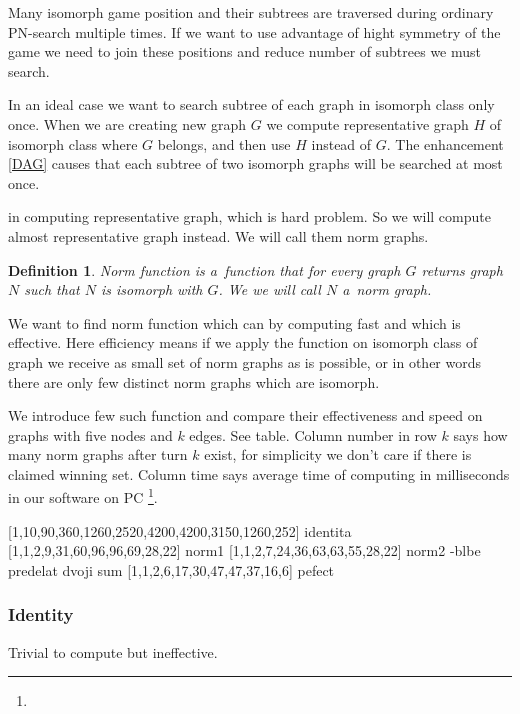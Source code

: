Many isomorph game position and their subtrees are traversed during ordinary
PN-search multiple times. If we want to use advantage of hight symmetry of the
game we need to join these positions and reduce number of subtrees we must
search.

In an ideal case we want to search subtree of each graph in isomorph class only
once. When we are creating new graph $G$ we compute 
representative graph $H$ of isomorph class where $G$ belongs, and then use $H$
instead of $G$. The enhancement  \ref{DAG} causes that
each subtree of two isomorph graphs will be searched at most once.

 in computing representative
graph, which is hard problem.   So we will compute almost
representative graph instead. We will call them norm graphs.

\newtheorem*{norm}{Definition}	
\begin{norm}
{\sl Norm function} is a~function that for
every graph $G$ returns graph $N$ such that $N$ is isomorph with $G$. We we will call
$N$ a~{\sl norm graph}.
\end{norm}

We want to find norm function which can by computing fast and
which is effective. Here efficiency means if we apply the function on
isomorph class of graph we receive as small set of norm graphs as is possible,
or in other words there are only few distinct norm graphs which are isomorph.

We introduce few such function and compare their effectiveness and speed on
graphs with five nodes and $k$ edges. See table. Column number in row $k$ says
how many norm graphs after turn $k$ exist, for simplicity we don't care if
there is claimed winning set. Column time says average time of computing in
milliseconds in our software on PC \footnote{}.
 

[1,10,90,360,1260,2520,4200,4200,3150,1260,252] identita
[1,1,2,9,31,60,96,96,69,28,22] norm1
[1,1,2,7,24,36,63,63,55,28,22] norm2 -blbe predelat dvoji sum
[1,1,2,6,17,30,47,47,37,16,6] pefect

\subsubsection{Identity}
Trivial to compute but ineffective.

